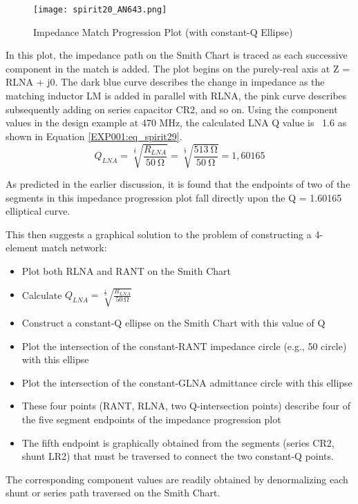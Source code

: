         \begin{figure}[ht!] %
          \centering
          \texttt{[image: spirit20\_AN643.png]}
          \caption{Impedance Match Progression Plot (with constant-Q Ellipse) \cite[s.~18]{AN643SiliconLabs}}
          \label{EXP001:fig_spirit20}
        \end{figure}
        
        In this plot, the impedance path on the Smith Chart is traced as each successive component 
        in the match is added. The plot begins on the purely-real axis at Z = RLNA + j0. The dark 
        blue curve describes the change in impedance as the matching inductor LM is added in 
        parallel with RLNA, the pink curve describes subsequently adding on series capacitor CR2, 
        and so on. Using the component values in the design example at 470 MHz, the calculated LNA 
        Q value is ~1.6 as shown in Equation 
        \ref{EXP001:eq_spirit29}.
        \begin{equation}\label{EXP001:eq_spirit29}
          Q_{LNA} = \sqrt[\frac{1}{2}]{\frac{R_{LNA}}{\SI{50}{\ohm}}}
                  = \sqrt[\frac{1}{2}]{\frac{\SI{513}{\ohm}}{\SI{50}{\ohm}}}
                  = 1,60165
        \end{equation}
        
        As predicted in the earlier discussion, it is found that the endpoints of two of the 
        segments in this impedance progression plot fall directly upon the Q = 1.60165 elliptical 
        curve.
        
        This then suggests a graphical solution to the problem of constructing a 4-element match network:
        \begin{itemize}\addtolength{\itemsep}{-0.5\baselineskip}
          \item Plot both RLNA and RANT on the Smith Chart
          \item Calculate \(Q_{LNA} = \sqrt[\frac{1}{2}]{\frac{R_{LNA}}{\SI{50}{\ohm}}}\)
          \item Construct a constant-Q ellipse on the Smith Chart with this value of Q
          \item Plot the intersection of the constant-RANT impedance circle (e.g., 50 circle) with 
                this ellipse
          \item Plot the intersection of the constant-GLNA admittance circle with this ellipse
          \item These four points (RANT, RLNA, two Q-intersection points) describe four of the 
                five segment endpoints of the impedance progression plot
          \item The fifth endpoint is graphically obtained from the segments (series CR2, shunt  
                LR2) that must be traversed to connect the two constant-Q points.
        \end{itemize}
        The corresponding component values are readily obtained by denormalizing each shunt or series path 
        traversed on the Smith Chart.

